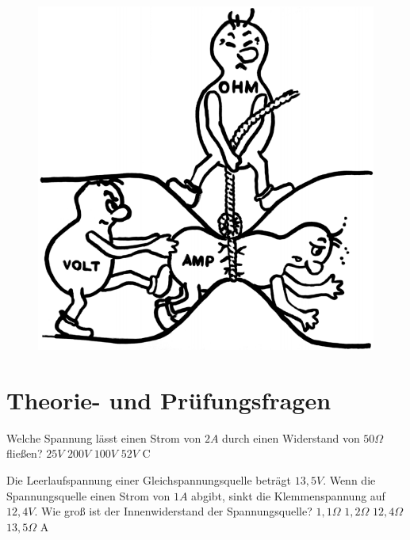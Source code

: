 

\begin{figure}
 \vspace{-7cm}
  \includegraphics[scale=0.15]{SSW/Bilder/URI.png}
 \vspace{-6cm}
\end{figure}

\section*{Theorie- und Prüfungsfragen}





{Welche Spannung lässt einen Strom von $2A$ durch einen Widerstand von $50\Omega$ fließen?}%
{$25V$}%
{$200V$}%
{$100V$}%
{$52V$}%
{C}%

{Die Leerlaufspannung einer Gleichspannungsquelle beträgt $13,5V$. Wenn die Spannungsquelle einen Strom von $1A$ abgibt, sinkt die Klemmenspannung auf $12,4V$. Wie groß ist der Innenwiderstand der Spannungsquelle?}%
{$1,1\Omega$}%
{$1,2\Omega$}%
{$12,4\Omega$}%
{$13,5\Omega$}%
{A}%

